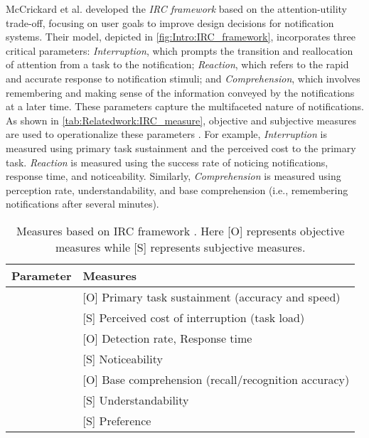 McCrickard et al. \cite{mccrickard_model_2003, chewar_unpacking_2004, mccrickard_attuning_2003, mccrickard_establishing_2003} developed the \textit{IRC framework} based on the attention-utility trade-off, focusing on user goals to improve design decisions for notification systems. Their model, depicted in \autoref{fig:Intro:IRC_framework}, incorporates three critical parameters: \textit{Interruption}, which prompts the transition and reallocation of attention from a task to the notification; \textit{Reaction}, which refers to the rapid and accurate response to notification stimuli; and \textit{Comprehension}, which involves remembering and making sense of the information conveyed by the notifications at a later time. These parameters capture the multifaceted nature of notifications. As shown in \autoref{tab:Relatedwork:IRC_measure}, objective and subjective measures are used to operationalize these parameters \cite{chewar_unpacking_2004}. For example, \textit{Interruption} is measured using primary task sustainment and the perceived cost to the primary task. \textit{Reaction} is measured using the success rate of noticing notifications, response time, and noticeability. Similarly, \textit{Comprehension} is measured using perception rate, understandability, and base comprehension (i.e., remembering notifications after several minutes).

\begin{table}[hptb]
\centering
\caption[Measures based on IRC framework]{Measures based on IRC framework \cite{chewar_unpacking_2004, mccrickard_model_2003, mccrickard_attuning_2003}. Here [O] represents objective measures while [S] represents subjective measures.}
\label{tab:Relatedwork:IRC_measure}
\small
\begin{tabular}{@{}ll@{}}
\toprule
Parameter & Measures \\ \midrule
\Interruption{} &  [O] Primary task sustainment (accuracy and speed)\\
     &  [S] Perceived cost of interruption (task load) \\
\Reaction{} &  [O]  Detection rate, Response time\\
    & [S] Noticeability \\
\Comprehension{} &  [O] Base comprehension (recall/recognition accuracy) \\
    & [S] Understandability \\
\Satisfaction{}  & [S] Preference \\ 
\bottomrule
\end{tabular}
\end{table}

